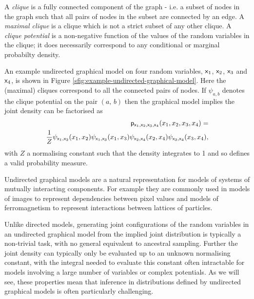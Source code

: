 A \emph{clique} is a fully connected component of the graph - i.e. a subset of nodes in the graph such that all pairs of nodes in the subset are connected by an edge. A \emph{maximal clique} is a clique which is not a strict subset of any other clique. A \emph{clique potential} is a non-negative function of the values of the random variables in the clique; it does necessarily correspond to any conditional or marginal probabilty density. 

An example undirected graphical model on four random variables, $\mathsf{x}_1$, $\mathsf{x}_2$, $\mathsf{x}_3$ and $\mathsf{x}_4$, is shown in Figure \ref{sfig:example-undirected-graphical-model}. Here the (maximal) cliques correspond to all the connected pairs of nodes. If $\psi_{a,b}$ denotes the clique potential on the pair $(a,\,b)$ then the graphical model implies the joint density can be factorised as
\begin{equation}\label{eq:example-undirected-graphical-model-factorisation}
\begin{split}
  \mathsf{p}_{\mathsf{x}_1,\mathsf{x}_2,\mathsf{x}_3,\mathsf{x}_4}(x_1,x_2,x_3,x_4) =\\
  \frac{1}{Z} 
  \psi_{\mathsf{x}_1,\mathsf{x}_2}(x_1,x_2)
  \psi_{\mathsf{x}_1,\mathsf{x}_3}(x_1,x_3)
  \psi_{\mathsf{x}_2,\mathsf{x}_4}(x_2,x_4)
  \psi_{\mathsf{x}_3,\mathsf{x}_4}(x_3,x_4),
\end{split}
\end{equation}
with $Z$ a normalising constant such that the density integrates to 1 and so defines a valid probability measure.

Undirected graphical models are a natural representation for models of systems of mutually interacting components. For example they are commonly used in models of images to represent dependencies between pixel values and models of ferromagnetism to represent interactions between lattices of particles. 

Unlike directed models, generating joint configurations of the random variables in an undirected graphical model from the implied joint distribution is typically a non-trivial task, with no general equivalent to ancestral sampling. Further the joint density can typically only be evaluated up to an unknown normalising constant, with the integral needed to evaluate this constant often intractable for models involving a large number of variables or complex potentials. As we will see, these properties mean that inference in distributions defined by undirected graphical models is often particularly challenging.

